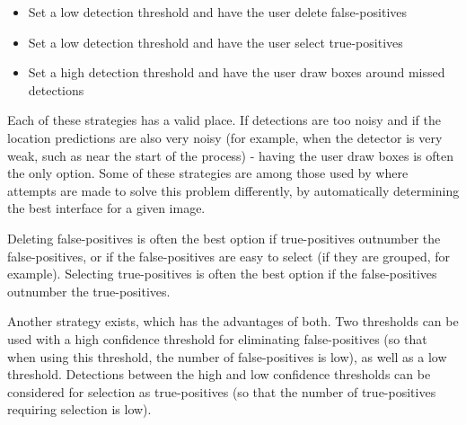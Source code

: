 \begin{itemize}
    \item Set a low detection threshold and have the user delete false-positives
    \item Set a low detection threshold and have the user select true-positives
    \item Set a high detection threshold and have the user draw boxes around missed detections
\end{itemize}

Each of these strategies has a valid place. If detections are too noisy and if the location predictions are also very noisy (for example, when the detector is very weak, such as near the start of the process) - having the user draw boxes is often the only option. Some of these strategies are among those used by \cite{Konyushkova2017} where attempts are made to solve this problem differently, by automatically determining the best interface for a given image.

Deleting false-positives is often the best option if true-positives outnumber the false-positives, or if the false-positives are easy to select (if they are grouped, for example). Selecting true-positives is often the best option if the false-positives outnumber the true-positives. 

Another strategy exists, which has the advantages of both. Two thresholds can be used with a high confidence threshold for eliminating false-positives (so that when using this threshold, the number of false-positives is low), as well as a low threshold. Detections between the high and low confidence thresholds can be considered for selection as true-positives (so that the number of true-positives requiring selection is low).



